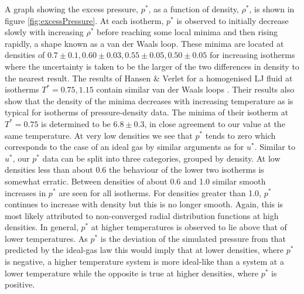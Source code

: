 \documentclass[10pt, twocolumn]{revtex4}    %
\begin{document}
A graph showing the excess pressure, $p^{*}$, as a function of density, $\rho{}^{*}$, is shown in figure \ref{fig:excessPressure}. At each isotherm, $p^{*}$ is observed to initially decrease slowly with increasing $\rho^{*}$ before reaching some local minima and then rising rapidly, a shape known as a van der Waals loop. These minima are located at densities of $0.7\pm{}0.1, 0.60\pm{}0.03, 0.55\pm{}0.05, 0.50\pm{}0.05$ for increasing isotherms where the uncertainty is taken to be the larger of the two differences in density to the nearest result. The results of Hansen \& Verlet for a homogenised LJ fluid at isotherms $T^{*}=0.75, 1.15$ contain similar van der Waals loops \cite{HansenVerlet1}. Their results also show that the density of the minima decreases with increasing temperature as is typical for isotherms of pressure-density data. The minima of their isotherm at $T^{*}=0.75$ is determined to be $6.8\pm{0.3}$, in close agreement to our value at the same temperature.
At very low densities we see that $p^{*}$ tends to zero which corresponds to the case of an ideal gas by similar arguments as for $u^{*}$.
Similar to $u^{*}$, our $p^{*}$ data can be split into three categories, grouped by density. At low densities less than about \num{0.6} the behaviour of the lower two isotherms is somewhat erratic. Between densities of about \num{0.6} and \num{1.0} similar smooth increases in $p^{*}$ are seen for all isotherms. For densities greater than \num{1.0}, $p^{*}$ continues to increase with density but this is no longer smooth. Again, this is most likely attributed to non-converged radial distribution functions at high densities.
In general, $p^{*}$ at higher temperatures is observed to lie above that of lower temperatures. As $p^{*}$ is the deviation of the simulated pressure from that predicted by the ideal-gas law this would imply that at lower densities, where $p^{*}$ is negative, a higher temperature system is more ideal-like than a system at a lower temperature while the opposite is true at higher densities, where $p^{*}$ is positive.
\end{document}
